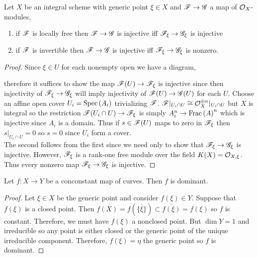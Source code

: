 \documentclass[12pt]{article}
\begin{document}
\begin{lemma} \label{generic_injection}
Let $X$ be an integral scheme with generic point $\xi \in X$ and $\mathscr{F} \to \mathscr{G}$ a map of $\mathcal{O}_{X}$-modules,
\begin{enumerate}
\item if $\mathscr{F}$ is locally free then $\mathscr{F} \to \mathscr{G}$ is injective iff $\mathscr{F}_\xi \to \mathscr{G}_\xi$ is injective
\item if $\mathscr{F}$ is invertible then $\mathscr{F} \to \mathscr{G}$ is injective iff $\mathscr{F}_\xi \to \mathscr{G}_\xi$ is nonzero.
\end{enumerate}
\end{lemma}

\begin{proof}
Since $\xi \in U$ for each nonempty open we have a diagram,
\begin{center}
\end{center}
therefore it suffices to show the map $\mathscr{F}(U) \to \mathscr{F}_\xi$ is injective since then injectivity of $\mathscr{F}_\xi \to \mathscr{G}_\xi$ will imply injectivity of $\mathscr{F}(U) \to \mathscr{G}(U)$ for each $U$. Choose an affine open cover $U_i = \mathrm{Spec}\left( A_i \right)$ trivializing $\mathscr{F}$. $\mathscr{F}|_{U_i \cap U} \cong \mathcal{O}_{X}^{\oplus n}|_{U_i \cap U}$ but $X$ is integral so the restriction $\mathscr{F}(U_i \cap U) \to \mathscr{F}_\xi$ is simply $A_i^n \to \mathrm{Frac}\left(A\right)^n$ which is injective since $A_i$ is a domain. Thus if $s \in \mathscr{F}(U)$ maps to zero in $\mathscr{F}_\xi$ then $s|_{U_i \cap U} = 0$ so $s = 0$ since $U_i$ form a cover.
\bigskip\\
The second follows from the first since we need only to show that $\mathscr{F}_\xi \to \mathscr{G}_\xi$ is injective. However, $\mathscr{F}_\xi$ is a rank-one free module over the field $K(X) = \mathcal{O}_{X, \xi}$. Thus every nonzero map $\mathscr{F}_\xi \to \mathscr{G}_\xi$ is injective.
\end{proof}

\begin{lemma}
Let $f : X \to Y$ be a conconstant map of curves. Then $f$ is dominant.
\end{lemma}

\begin{proof}
Let $\xi \in X$ be the generic point and consider $f(\xi) \in Y$. Suppose that $f(\xi)$ is a closed point. Then $f(X) = f(\overline{\{ \xi \}}) \subset \overline{f(\xi)} = f(\xi)$ so $f$ is constant. Therefore, we must have $f(\xi)$ a nonclosed point. But $\dim{Y} = 1$ and irreducible so any point is either closed or the generic point of the unique irreducible component. Therefore, $f(\xi) = \eta$ the generic point so $f$ is dominant.
\end{proof}
\end{document}
